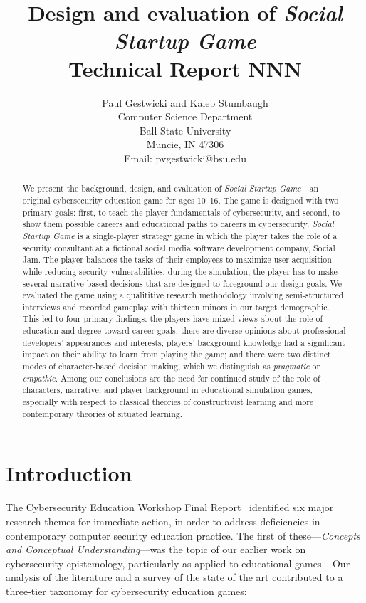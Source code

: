 \documentclass[letterpaper]{article}
\title{Design and evaluation of \textit{Social Startup Game}\\
\medskip
\serc{} Technical Report \textbf{NNN}\\
}
\author{Paul Gestwicki and Kaleb Stumbaugh\\
Computer Science Department\\
Ball State University\\
Muncie, IN 47306\\
Email: pvgestwicki@bsu.edu}
\begin{document}
\maketitle


\begin{abstract}
We present the background, design, and evaluation of 
\textit{Social Startup Game}---an original cybersecurity education
game for ages 10--16.
The game is designed with two primary goals: first, to teach the player
fundamentals of cybersecurity, and second, to show them possible
careers and educational paths to careers in cybersecurity.
\textit{Social Startup Game} is a single-player strategy game in
which the player takes the role of a security consultant at a fictional
social media software development company, Social Jam.
The player balances the tasks of their employees to maximize user
acquisition while reducing security vulnerabilities; during the simulation,
the player has to make several narrative-based decisions that are designed
to foreground our design goals.
We evaluated the game using a qualititive research methodology
involving semi-structured interviews and recorded gameplay with
thirteen minors in our target demographic.
This led to four primary findings:
the players have mixed views about the role of education and degree
toward career goals;
there are diverse opinions about professional 
developers' appearances and interests;
players' background knowledge had a significant impact on their
ability to learn from playing the game;
and
there were two distinct modes of character-based decision making,
which we distinguish as \textit{pragmatic} or \textit{empathic}.
Among our conclusions are the need for continued study of the
role of characters, narrative, and player background in educational
simulation games, especially with respect to classical theories
of constructivist learning and more contemporary theories of situated learning.

\end{abstract}

\section{Introduction}

The Cybersecurity Education Workshop Final
Report~\cite{Cybersecurity2014} identified six major research themes
for immediate action, in order to address deficiencies in contemporary
computer security education practice. The first of these---\textit{Concepts and Conceptual Understanding}---was the topic of our earlier work
on cybersecurity epistemology, particularly as applied to
educational games~\citep{Gestwicki2015,Gestwicki2015-tr}.
Our analysis of the literature and a survey of the state of the art
contributed to a three-tier taxonomy for cybersecurity education games:
\end{document}
